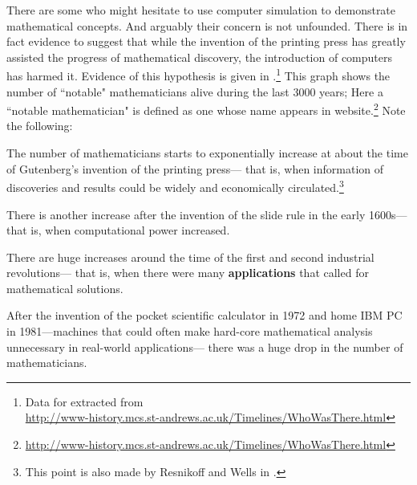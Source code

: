 There are some who might hesitate to use computer simulation to demonstrate mathematical concepts.
And arguably their concern is not unfounded.
There is in fact evidence to suggest that while the invention of the printing press has greatly
assisted the progress of mathematical discovery, the introduction of computers has harmed it.
Evidence of this hypothesis is given in
.\footnote{Data for  extracted from \\
  \url{http://www-history.mcs.st-andrews.ac.uk/Timelines/WhoWasThere.html}}
This graph shows the number of ``notable" mathematicians alive during the last 3000 years;
Here a ``notable mathematician" is defined as one whose name appears
in  
website.\footnote{\url{http://www-history.mcs.st-andrews.ac.uk/Timelines/WhoWasThere.html}}
Note the following:
\begin{liste}

\item The number of mathematicians starts to exponentially increase at
about the time of Gutenberg's invention of the printing press---
that is, when information of discoveries and results could be widely and economically
circulated.\footnote{This point is also made by Resnikoff and Wells in .}

\item There is another increase after the invention of the slide rule in the early 1600s---
that is, when computational power increased.

\item There are huge increases around the time of the first and second industrial revolutions---
that is, when there were many {\bf applications} that called for mathematical solutions.

\item After the invention of the pocket scientific calculator in 1972
and home IBM PC in 1981---machines that could
often make hard-core mathematical analysis unnecessary in real-world applications---
there was a huge drop in the number of mathematicians.

\end{liste}





